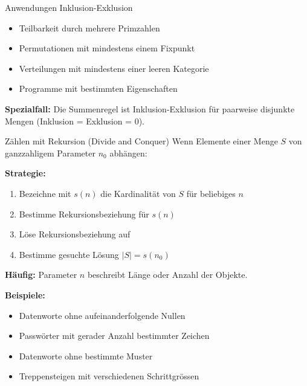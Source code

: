 \documentclass[a4paper, fontsize=7pt]{scrartcl}
\begin{document}
\begin{subbox}{Anwendungen Inklusion-Exklusion}
\begin{itemize}
    \item Teilbarkeit durch mehrere Primzahlen
    \item Permutationen mit mindestens einem Fixpunkt
    \item Verteilungen mit mindestens einer leeren Kategorie
    \item Programme mit bestimmten Eigenschaften
\end{itemize}

\textbf{Spezialfall:} Die Summenregel ist Inklusion-Exklusion für paarweise disjunkte Mengen (Inklusion = Exklusion = 0).
\end{subbox}

\begin{mainbox}{Zählen mit Rekursion (Divide and Conquer)}
Wenn Elemente einer Menge $S$ von ganzzahligem Parameter $n_0$ abhängen:

\textbf{Strategie:}
\begin{enumerate}
    \item Bezeichne mit $s(n)$ die Kardinalität von $S$ für beliebiges $n$
    \item Bestimme Rekursionsbeziehung für $s(n)$
    \item Löse Rekursionsbeziehung auf
    \item Bestimme gesuchte Lösung $|S| = s(n_0)$
\end{enumerate}

\textbf{Häufig:} Parameter $n$ beschreibt Länge oder Anzahl der Objekte.

\textbf{Beispiele:}
\begin{itemize}
    \item Datenworte ohne aufeinanderfolgende Nullen
    \item Passwörter mit gerader Anzahl bestimmter Zeichen
    \item Datenworte ohne bestimmte Muster
    \item Treppensteigen mit verschiedenen Schrittgrössen
\end{itemize}
\end{mainbox}
\end{document}
